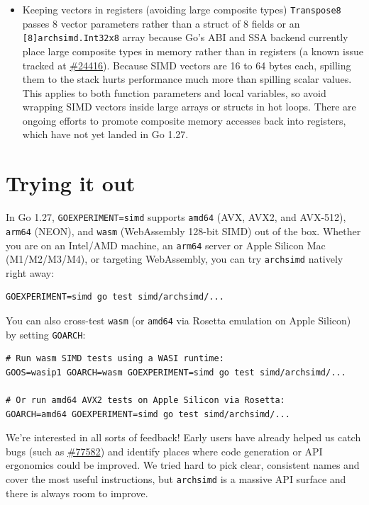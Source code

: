 \documentclass[11pt,a4paper]{article}
\begin{document}
\begin{itemize}
\item Keeping vectors in registers (avoiding large composite types) \texttt{Transpose8} passes 8 vector parameters rather than a struct of 8 fields or an \texttt{[8]archsimd.Int32x8} array because Go's ABI and SSA backend currently place large composite types in memory rather than in registers (a known issue tracked at \href{https://go.dev/issue/24416}{\#24416}). Because SIMD vectors are 16 to 64 bytes each, spilling them to the stack hurts performance much more than spilling scalar values. This applies to both function parameters and local variables, so avoid wrapping SIMD vectors inside large arrays or structs in hot loops. There are ongoing efforts to promote composite memory accesses back into registers, which have not yet landed in Go 1.27.
\end{itemize}

\section{Trying it out}

In Go 1.27, \texttt{GOEXPERIMENT=simd} supports \texttt{amd64} (AVX, AVX2, and AVX-512), \texttt{arm64} (NEON), and \texttt{wasm} (WebAssembly 128-bit SIMD) out of the box. Whether you are on an Intel/AMD machine, an \texttt{arm64} server or Apple Silicon Mac (M1/M2/M3/M4), or targeting WebAssembly, you can try \texttt{archsimd} natively right away:

\begin{verbatim}
GOEXPERIMENT=simd go test simd/archsimd/...
\end{verbatim}

You can also cross-test \texttt{wasm} (or \texttt{amd64} via Rosetta emulation on Apple Silicon) by setting \texttt{GOARCH}:

\begin{verbatim}
# Run wasm SIMD tests using a WASI runtime:
GOOS=wasip1 GOARCH=wasm GOEXPERIMENT=simd go test simd/archsimd/...

# Or run amd64 AVX2 tests on Apple Silicon via Rosetta:
GOARCH=amd64 GOEXPERIMENT=simd go test simd/archsimd/...
\end{verbatim}

We're interested in all sorts of feedback! Early users have already helped us catch bugs (such as \href{https://go.dev/issue/77582}{\#77582}) and identify places where code generation or API ergonomics could be improved. We tried hard to pick clear, consistent names and cover the most useful instructions, but \texttt{archsimd} is a massive API surface and there is always room to improve.
\end{document}
